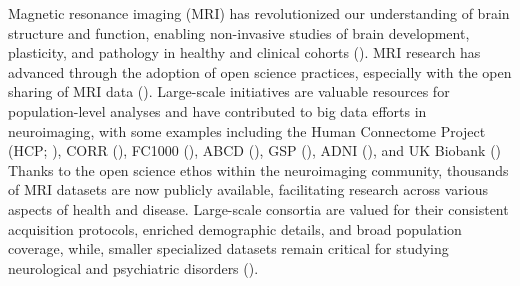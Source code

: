 Magnetic resonance imaging (MRI) has revolutionized our understanding of brain structure and function,
enabling non-invasive studies of brain development, plasticity, and pathology in healthy and clinical cohorts (\cite{katti2011magnetic, mills2014methods}).
MRI research has advanced through the adoption of open science practices, especially 
with the open sharing of MRI data (\cite{snoek2021amsterdam, van2013wu, miller2016multimodal, di2014autism}).
Large-scale initiatives are valuable resources for population-level analyses 
and have contributed to big data efforts in neuroimaging, with some examples including the 
Human Connectome Project (HCP; \cite{van2013wu}), CORR (\cite{gorgolewski2017preprocessed}), 
FC1000 (\cite{biswal2010toward}), ABCD (\cite{casey2018adolescent}), GSP (\cite{holmes2015brain}), ADNI (\cite{mueller2005alzheimer}), 
and UK Biobank (\cite{miller2016multimodal}) 
Thanks to the open science ethos within the neuroimaging community, thousands of MRI datasets are now publicly available, 
facilitating research across various aspects of health and disease. 
Large-scale consortia are valued for their consistent acquisition protocols, 
enriched demographic details, and broad population coverage, 
while, smaller specialized datasets remain critical for studying neurological and psychiatric disorders 
(\cite{soler2022brain, fajardo2024functional, gibson2024aphasia}). 


